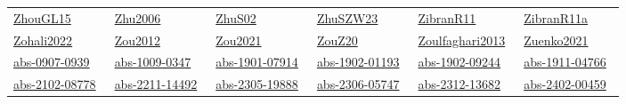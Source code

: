 \begin{longtable}{*{6}{l}}
\href{../scheduling/works/ZhouGL15.pdf}{ZhouGL15}~\cite{ZhouGL15} & \href{../}{Zhu2006}~\cite{Zhu2006} & \href{../scheduling/works/ZhuS02.pdf}{ZhuS02}~\cite{ZhuS02} & \href{../scheduling/works/ZhuSZW23.pdf}{ZhuSZW23}~\cite{ZhuSZW23} & \href{../scheduling/works/ZibranR11.pdf}{ZibranR11}~\cite{ZibranR11} & \href{../scheduling/works/ZibranR11a.pdf}{ZibranR11a}~\cite{ZibranR11a}\\ 
\href{../}{Zohali2022}~\cite{Zohali2022} & \href{../scheduling/works/Zou2012.pdf}{Zou2012}~\cite{Zou2012} & \href{../scheduling/works/Zou2021.pdf}{Zou2021}~\cite{Zou2021} & \href{../scheduling/works/ZouZ20.pdf}{ZouZ20}~\cite{ZouZ20} & \href{../}{Zoulfaghari2013}~\cite{Zoulfaghari2013} & \href{../scheduling/works/Zuenko2021.pdf}{Zuenko2021}~\cite{Zuenko2021}\\ 
\href{../scheduling/works/abs-0907-0939.pdf}{abs-0907-0939}~\cite{abs-0907-0939} & \href{../scheduling/works/abs-1009-0347.pdf}{abs-1009-0347}~\cite{abs-1009-0347} & \href{../scheduling/works/abs-1901-07914.pdf}{abs-1901-07914}~\cite{abs-1901-07914} & \href{../scheduling/works/abs-1902-01193.pdf}{abs-1902-01193}~\cite{abs-1902-01193} & \href{../scheduling/works/abs-1902-09244.pdf}{abs-1902-09244}~\cite{abs-1902-09244} & \href{../scheduling/works/abs-1911-04766.pdf}{abs-1911-04766}~\cite{abs-1911-04766}\\ 
\href{../scheduling/works/abs-2102-08778.pdf}{abs-2102-08778}~\cite{abs-2102-08778} & \href{../scheduling/works/abs-2211-14492.pdf}{abs-2211-14492}~\cite{abs-2211-14492} & \href{../scheduling/works/abs-2305-19888.pdf}{abs-2305-19888}~\cite{abs-2305-19888} & \href{../scheduling/works/abs-2306-05747.pdf}{abs-2306-05747}~\cite{abs-2306-05747} & \href{../scheduling/works/abs-2312-13682.pdf}{abs-2312-13682}~\cite{abs-2312-13682} & \href{../scheduling/works/abs-2402-00459.pdf}{abs-2402-00459}~\cite{abs-2402-00459}\\ 
\end{longtable}
